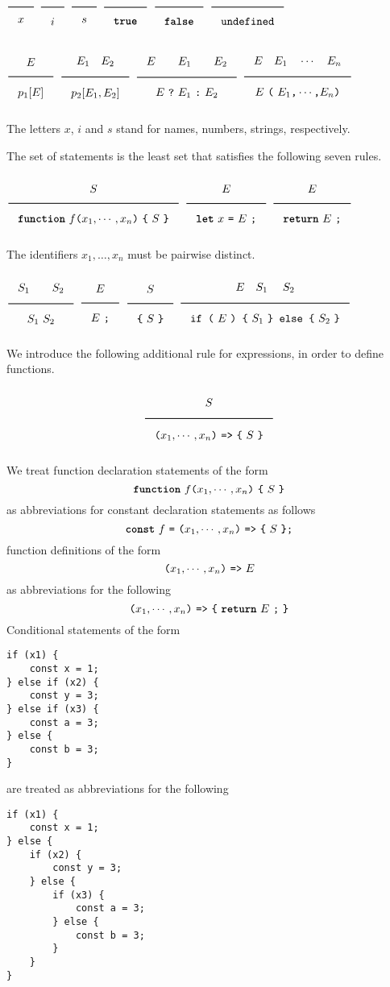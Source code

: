 $\Rule{}{x}$
\hfill 
$\Rule{}{i}$
\hfill 
$\Rule{}{s}$
\hfill 
$\Rule{}{\TruE}$
\hfill 
$\Rule{}{\FalsE}$
\hfill 
$\Rule{}{\Undefined}$

$\Rule{E}{p_1[E]}$
\hfill
$\Rule{E_1\quad E_2}{p_2[E_1, E_2]}$
\hfill
$\Rule{E \qquad E_1 \qquad E_2}{E\ \texttt{?}\ E_1\ \texttt{:}\ E_2}$
\hfill
$\Rule{E\quad E_1\quad \cdots \quad E_n}{E\ \Lp\ E_1\texttt{,}\cdots\texttt{,} E_n\Rp}$

The letters $x$, $i$ and $s$ stand for names, numbers, strings, respectively.

The set of statements is 
the least set that satisfies the
following seven rules.

$\Rule{S}{\Fun\ f \Lp x_1,\cdots, x_n\Rp\ \Lc\ S\ \Rc}$
\hfill
$\Rule{E}{\Let\ x\ \texttt{=}\ E\ \texttt{;}}$
\hfill
$\Rule{E}{\Return\ E\ \texttt{;}}$

\noindent
The identifiers $x_1,\ldots,x_n$ must be pairwise distinct.

$\Rule{S_1 \qquad S_2}{S_1\ S_2}$
\hfill
$\Rule{E}{E\ \texttt{;}}$
\hfill
$\Rule{S}{\Lc\ S\ \Rc}$
\hfill
$\Rule{E \quad S_1\ \quad S_2}{\texttt{if (}\ E \ \texttt{) \{}\ S_1\ \texttt{\} else \{}\ S_2\ \texttt{\}}}$

\noindent
We introduce the following additional rule for expressions, in order
to define functions.

\[ \Rule{S}{\Lp x_1,\cdots, x_n\Rp\ \texttt{=>}\ \Lc\ S\ \Rc} \]

\noindent
We treat function declaration statements of the form
%
\[ \Fun\ f \Lp x_1,\cdots, x_n\Rp\ \Lc\ S\ \Rc \]
%
\noindent
as abbreviations for constant declaration statements as follows
%
\[ \textbf{\texttt{const}}\ f\ \texttt{=}\ \texttt{(} x_1,\cdots, x_n\texttt{)}\ \texttt{=>}\ \texttt{\{}\ S\ \texttt{\}} \texttt{;} \]
%
function definitions of the form 
%
\[ \texttt{(} x_1,\cdots, x_n\texttt{)}\ \texttt{=>}\ E \]
%
\noindent
as abbreviations for the following
%
\[ \Lp x_1,\cdots, x_n\Rp\ \texttt{=>}\ \Lc\ \Return\ E\ \texttt{;}\ \Rc \]
%
Conditional statements of the form 
\begin{lstlisting}
if (x1) {
    const x = 1;    
} else if (x2) {
    const y = 3;
} else if (x3) {
    const a = 3;
} else {
    const b = 3;
}
\end{lstlisting}
\noindent
are treated as abbreviations for the following
\begin{lstlisting}
if (x1) {
    const x = 1;    
} else {
    if (x2) {
        const y = 3;
    } else {
        if (x3) {
            const a = 3;
        } else {
            const b = 3;
        }
    }
}
\end{lstlisting}
  
